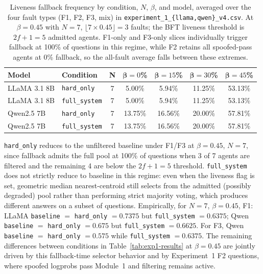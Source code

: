 \documentclass[11pt]{article}
\begin{document}
\begin{table}[!t]
\centering
\caption{Liveness fallback frequency by condition, $N$, $\beta$, and model,
  averaged over the four fault types (F1, F2, F3, mix) in
  \texttt{experiment\_1\_\{llama,qwen\}\_v4.csv}. At $\beta=0.45$ with $N=7$,
  $\lfloor 7 \times 0.45 \rfloor = 3$ faults; the BFT liveness threshold is
  $2f+1=5$ admitted agents. F1-only and F3-only slices individually trigger
  fallback at 100\% of questions in this regime, while F2 retains all
  spoofed-pass agents at 0\% fallback, so the all-fault average falls between
  these extremes.}
\label{tab:liveness}
\small
\begin{tabular}{llccccc}
\toprule
\textbf{Model} & \textbf{Condition} & \textbf{N}
  & $\bm{\beta}=0$\% & $\bm{\beta}=15$\%
  & $\bm{\beta}=30$\% & $\bm{\beta}=45$\% \\
\midrule
LLaMA 3.1 8B & \texttt{hard\_only}   & 7 & 5.00\%  & 5.94\%  & 11.25\% & 53.13\% \\
LLaMA 3.1 8B & \texttt{full\_system} & 7 & 5.00\%  & 5.94\%  & 11.25\% & 53.13\% \\
Qwen2.5 7B   & \texttt{hard\_only}   & 7 & 13.75\% & 16.56\% & 20.00\% & 57.81\% \\
Qwen2.5 7B   & \texttt{full\_system} & 7 & 13.75\% & 16.56\% & 20.00\% & 57.81\% \\
\bottomrule
\end{tabular}
\end{table}

\texttt{hard\_only} reduces to the unfiltered baseline under F1/F3 at
$\beta=0.45$, $N=7$, since fallback admits the full pool at 100\% of questions
when 3 of 7 agents are filtered and the remaining 4 are below the $2f+1=5$
threshold. \texttt{full\_system} does not strictly reduce to baseline in this
regime: even when the liveness flag is set, geometric median nearest-centroid
still selects from the admitted (possibly degraded) pool rather than performing
strict majority voting, which produces different answers on a subset of
questions. Empirically, for $N=7$, $\beta=0.45$, F1: LLaMA \texttt{baseline}
$=$ \texttt{hard\_only} $= 0.7375$ but \texttt{full\_system} $= 0.6375$; Qwen
\texttt{baseline} $=$ \texttt{hard\_only} $= 0.675$ but \texttt{full\_system}
$= 0.6625$. For F3, Qwen \texttt{baseline} $=$ \texttt{hard\_only} $= 0.575$
while \texttt{full\_system} $= 0.6375$. The remaining differences between
conditions in Table~\ref{tab:exp1-results} at $\beta=0.45$ are jointly driven
by this fallback-time selector behavior and by Experiment~1 F2 questions, where
spoofed logprobs pass Module~1 and filtering remains active.
\end{document}

